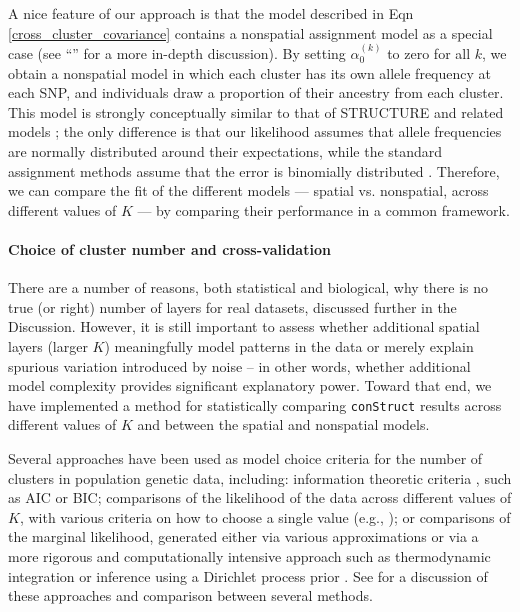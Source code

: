 \documentclass[12pt]{article}
\newcommand{\secref}[1]{``\nameref{#1}''}
\begin{document}
A nice feature of our approach is that the model described in Eqn \eqref{cross_cluster_covariance} 
contains a nonspatial assignment model as a special case 
(see \secref{model_app} for a more in-depth discussion). 
By setting $\alpha_0^{(k)}$ to zero for all $k$, 
we obtain a nonspatial model in which each cluster has its own allele frequency at each SNP, 
and individuals draw a proportion of their ancestry from each cluster. 
This model is strongly conceptually similar to that of STRUCTURE \citep{STRUCTURE} 
and related models \citep[e.g.][]{ADMIXTURE}; 
the only difference is that our likelihood assumes that allele frequencies are normally distributed 
around their expectations, 
while the standard assignment methods assume that the error is binomially distributed \citep{Engelhardt2012}.  
Therefore, we can compare the fit of the different models 
--- spatial vs. nonspatial, across different values of $K$ --- 
by comparing their performance in a common framework.

\paragraph{Choice of cluster number and cross-validation}
There are a number of reasons, both statistical and biological, 
why there is no true (or right) number of layers for real datasets,
discussed further in the Discussion.
However, it is still important to assess whether additional spatial layers (larger $K$)
meaningfully model patterns in the data
or merely explain spurious variation introduced by noise
-- in other words, whether additional model complexity
provides significant explanatory power.
Toward that end, we have implemented a method for 
statistically comparing \texttt{conStruct} results across different values of $K$ 
and between the spatial and nonspatial models.

Several approaches have been used as model choice criteria 
for the number of clusters in population genetic data, including: 
information theoretic criteria \citep[e.g.][]{ADMIXTURE}, such as AIC or BIC;
comparisons of the likelihood of the data across different values of $K$, 
with various criteria on how to choose a single value (e.g., \citep{Evanno2005});
or comparisons of the marginal likelihood, 
generated either via various approximations \citep[e.g.][]{STRUCTURE}
or via a more rigorous and computationally intensive approach such as thermodynamic integration \citep{verity_nichols2016}
or inference using a Dirichlet process prior \citep{huelsenbeck2007inference}.
See \cite{verity_nichols2016} for a discussion of these approaches and comparison
between several methods.
\end{document}
